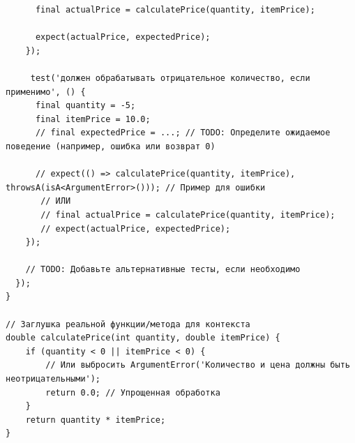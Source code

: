 \documentclass[14pt, russian]{scrartcl}
\begin{document}
\begin{verbatim}
      final actualPrice = calculatePrice(quantity, itemPrice);

      expect(actualPrice, expectedPrice);
    });

     test('должен обрабатывать отрицательное количество, если применимо', () {
      final quantity = -5;
      final itemPrice = 10.0;
      // final expectedPrice = ...; // TODO: Определите ожидаемое поведение (например, ошибка или возврат 0)

      // expect(() => calculatePrice(quantity, itemPrice), throwsA(isA<ArgumentError>())); // Пример для ошибки
       // ИЛИ
       // final actualPrice = calculatePrice(quantity, itemPrice);
       // expect(actualPrice, expectedPrice);
    });

    // TODO: Добавьте альтернативные тесты, если необходимо
  });
}

// Заглушка реальной функции/метода для контекста
double calculatePrice(int quantity, double itemPrice) {
    if (quantity < 0 || itemPrice < 0) {
        // Или выбросить ArgumentError('Количество и цена должны быть неотрицательными');
        return 0.0; // Упрощенная обработка
    }
    return quantity * itemPrice;
}
\end{verbatim}
\end{document}
